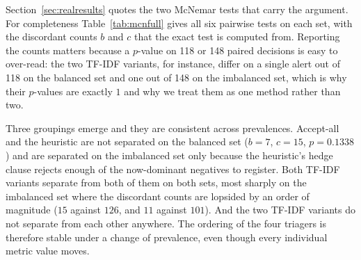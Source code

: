\documentclass[journal]{IEEEtran}
\theoremstyle{definition}
\newcommand{\RNbal}{118}
\newcommand{\RNimb}{148}
\begin{document}
Section~\ref{sec:realresults} quotes the two McNemar tests that carry the
argument. For completeness Table~\ref{tab:mcnfull} gives all six pairwise tests
on each set, with the discordant counts $b$ and $c$ that the exact test is
computed from. Reporting the counts matters because a $p$-value on 118 or 148
paired decisions is easy to over-read: the two TF-IDF variants, for instance,
differ on a single alert out of \RNbal{} on the balanced set and one out of
\RNimb{} on the imbalanced set, which is why their $p$-values are exactly
$1$ and why we treat them as one method rather than two.

Three groupings emerge and they are consistent across prevalences. Accept-all
and the heuristic are not separated on the balanced set
($b=7$, $c=15$, $p=0.1338$) and are separated on the imbalanced set only
because the heuristic's hedge clause rejects enough of the now-dominant
negatives to register. Both TF-IDF variants separate from both of them on both
sets, most sharply on the imbalanced set where the discordant counts are
lopsided by an order of magnitude ($15$ against $126$, and $11$ against
$101$). And the two TF-IDF variants do not separate from each other anywhere.
The ordering of the four triagers is therefore stable under a change of
prevalence, even though every individual metric value moves.
\end{document}
